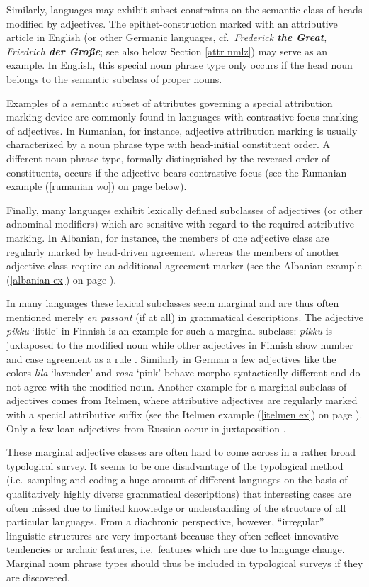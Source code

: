 Similarly, languages may exhibit subset constraints on the semantic class of heads modified by adjectives. The epithet-construction marked with an attributive article in English (or other Germanic languages, cf.~\textit{Frederick \textbf{the Great}, Friedrich \textbf{der Große}}; see also below Section \ref{attr nmlz}) may serve as an example. In English, this special noun phrase type only occurs if the head noun belongs to the semantic subclass of proper nouns. 

Examples of a semantic subset of attributes governing a special attribution marking device are commonly found in languages with contrastive focus marking of adjectives. In Rumanian, for instance, adjective attribution marking is usually characterized by a noun phrase type with head-initial constituent order. A different noun phrase type, formally distinguished by the reversed order of constituents, occurs if the adjective bears contrastive focus (see the Rumanian example (\ref{rumanian wo}) on page \pageref{rumanian wo} below).

Finally, many languages exhibit lexically defined subclasses of adjectives (or other adnominal modifiers) which are sensitive with regard to the required attributive marking. In Albanian, for instance, the members of one adjective class are regularly marked by head-driven agreement whereas the members of another adjective class require an additional agreement marker (see the Albanian example (\ref{albanian ex}) on page \pageref{albanian synchr}).

In many languages these lexical subclasses seem marginal and are thus often mentioned merely \emph{en passant} (if at all) in grammatical descriptions. The adjective \textit{pikku} ‘little’ in Finnish is an example for such a marginal subclass: \textit{pikku} is juxtaposed to the modified noun while other adjectives in Finnish show number and case agreement as a rule \citep[75]{karlsson1999}. Similarly in German a few adjectives like the colors \textit{lila} ‘lavender’ and \textit{rosa} ‘pink’ behave morpho-syntactically different and do not agree with the modified noun. Another example for a marginal subclass of adjectives comes from Itelmen, where attributive adjectives are regularly marked with a special attributive suffix (see the Itelmen example (\ref{itelmen ex}) on page \pageref{itelmen synchr}). Only a few loan adjectives from Russian occur in juxtaposition \citep[60–71]{volodin1997}.

These marginal adjective classes are often hard to come across in a rather broad typological survey. It seems to be one disadvantage of the typological method (i.e.~sampling and coding a huge amount of different languages on the basis of qualitatively highly diverse grammatical descriptions) that interesting cases are often missed due to limited knowledge or understanding of the structure of all particular languages. From a diachronic perspective, however, “irregular” linguistic structures are very important because they often reflect innovative tendencies or archaic features, i.e.~features which are due to language change. Marginal noun phrase types should thus be included in typological surveys if they are discovered.
